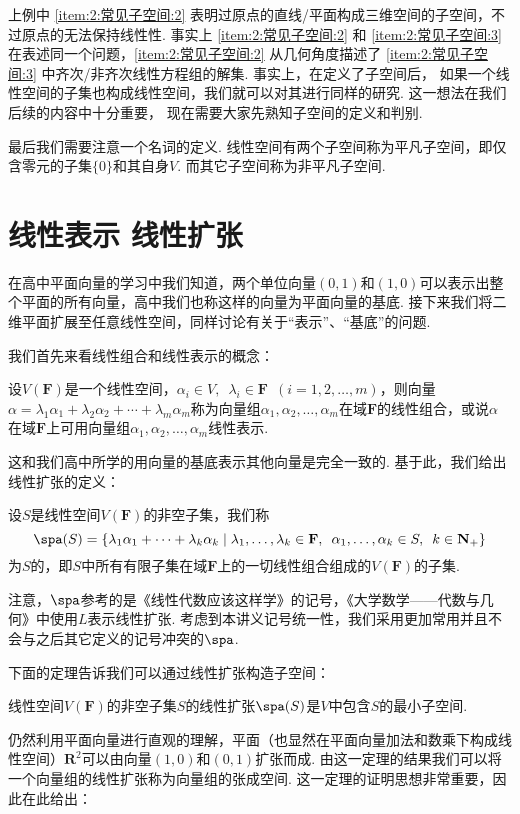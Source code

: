 上例中 \ref*{item:2:常见子空间:2} 表明过原点的直线/平面构成三维空间的子空间，不过原点的无法保持线性性. 事实上 \ref*{item:2:常见子空间:2} 和 \ref*{item:2:常见子空间:3} 在表述同一个问题，\ref*{item:2:常见子空间:2} 从几何角度描述了 \ref*{item:2:常见子空间:3} 中齐次/非齐次线性方程组的解集. 事实上，在定义了子空间后， 如果一个线性空间的子集也构成线性空间，我们就可以对其进行同样的研究. 这一想法在我们后续的内容中十分重要， 现在需要大家先熟知子空间的定义和判别.

最后我们需要注意一个名词的定义. 线性空间有两个子空间称为平凡子空间，即仅含零元的子集$\{0\}$和其自身$V$. 而其它子空间称为非平凡子空间.

\section{线性表示 \quad 线性扩张}

在高中平面向量的学习中我们知道，两个单位向量$(0,1)$和$(1,0)$可以表示出整个平面的所有向量，高中我们也称这样的向量为平面向量的基底. 接下来我们将二维平面扩展至任意线性空间，同样讨论有关于``表示''、``基底''的问题.

我们首先来看线性组合和线性表示的概念：
\begin{definition}
    设$V(\mathbf{F})$是一个线性空间，$\alpha_i\in V,\enspace\lambda_i\in \mathbf{F}\enspace(i=1,2,\ldots,m)$，则向量$\alpha=\lambda_1\alpha_1+\lambda_2\alpha_2+\cdots+\lambda_m\alpha_m$称为向量组$\alpha_1,\alpha_2,\ldots,\alpha_m$在域$\mathbf{F}$的线性组合，或说$\alpha$在域$\mathbf{F}$上可用向量组$\alpha_1,\alpha_2,\ldots,\alpha_m$线性表示.
\end{definition}
这和我们高中所学的用向量的基底表示其他向量是完全一致的. 基于此，我们给出线性扩张的定义：
\begin{definition}
    设$S$是线性空间$V(\mathbf{F})$的非空子集，我们称
    \[ \spa(S)=\{\lambda_1\alpha_1+\cdots+\lambda_k\alpha_k \mid \lambda_1,\ldots,\lambda_k\in\mathbf{F},\enspace\alpha_1,\ldots,\alpha_k\in S,\enspace k\in\mathbf{N}_+\} \]
    为$S$的，即$S$中所有有限子集在域$\mathbf{F}$上的一切线性组合组成的$V(\mathbf{F})$的子集.
\end{definition}
注意，$\spa$参考的是《线性代数应该这样学》的记号，《大学数学——代数与几何》中使用$L$表示线性扩张. 考虑到本讲义记号统一性，我们采用更加常用并且不会与之后其它定义的记号冲突的$\spa$.

下面的定理告诉我们可以通过线性扩张构造子空间：
\begin{theorem}\label{thm:2:线性扩张构造子空间}
    线性空间$V(\mathbf{F})$的非空子集$S$的线性扩张$\spa(S)$是$V$中包含$S$的最小子空间.
\end{theorem}
仍然利用平面向量进行直观的理解，平面（也显然在平面向量加法和数乘下构成线性空间）$\mathbf{R}^2$可以由向量$(1,0)$和$(0,1)$扩张而成. 由这一定理的结果我们可以将一个向量组的线性扩张称为向量组的张成空间. 这一定理的证明思想非常重要，因此在此给出：

